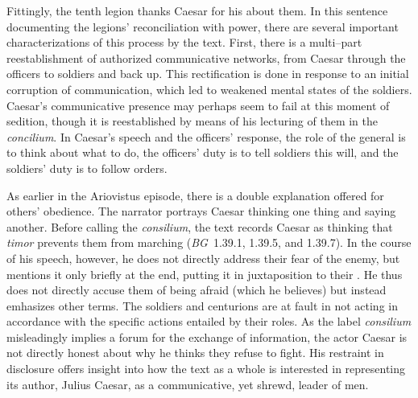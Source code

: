 \documentclass[12pt,letterpaper,oneside,final]{memoir}
\begin{document}
Fittingly, the tenth legion thanks Caesar for his  about them. In this sentence documenting the legions' reconciliation with power, there are several important characterizations of this process by the text. First, there is a multi--part reestablishment of authorized communicative networks, from Caesar through the officers to soldiers and back up. This rectification is done in response to an initial corruption of communication, which led to weakened mental states of the soldiers. Caesar's communicative presence may perhaps seem to fail at this moment of sedition, though it is reestablished by means of his lecturing of them in the \emph{concilium}. In Caesar's speech and the officers' response, the role of the general is to think about what to do, the officers' duty is to tell soldiers this will, and the soldiers' duty is to follow orders. 

As earlier in the Ariovistus episode, there is a double explanation offered for others' obedience. The narrator portrays Caesar thinking one thing and saying another. Before calling the \emph{consilium}, the text records Caesar as thinking that \emph{timor} prevents them from marching (\emph{BG}~1.39.1, 1.39.5, and 1.39.7). In the course of his speech, however, he does not directly address their fear of the enemy, but mentions it only briefly at the end, putting it in juxtaposition to their . He thus does not directly accuse them of being afraid (which he believes) but instead emhasizes other terms. The soldiers and centurions are at fault in not acting in accordance with the specific actions entailed by their roles. As the label \emph{consilium} misleadingly implies a forum for the exchange of information, the actor Caesar is not directly honest about why he thinks they refuse to fight. His restraint in disclosure offers insight into how the text as a whole is interested in representing its author, Julius Caesar, as a communicative, yet shrewd, leader of men.
\end{document}
